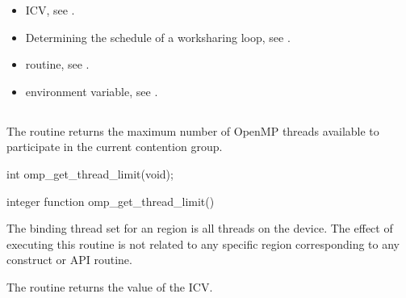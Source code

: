 \crossreferences
\begin{itemize}
\item {} ICV, see
.

\item Determining the schedule of a worksharing loop, see
.

\item {} routine, see
.

\item {} environment variable, see
.
\end{itemize}









\subsection{}
\label{subsec:omp_get_thread_limit}
\summary
The  routine returns the maximum number of OpenMP
threads available to participate in the current contention group.


\format
\begin{ccppspecific}
\begin{ompcFunction}
int omp_get_thread_limit(void);
\end{ompcFunction}
\end{ccppspecific}

\begin{fortranspecific}
\begin{ompfFunction}
integer function omp_get_thread_limit()
\end{ompfFunction}
\end{fortranspecific}

\binding
The binding thread set for an  region is all threads on the
device. The effect of executing this routine is not related to any specific region
corresponding to any construct or API routine.

\effect
The  routine returns the value of the  ICV.

